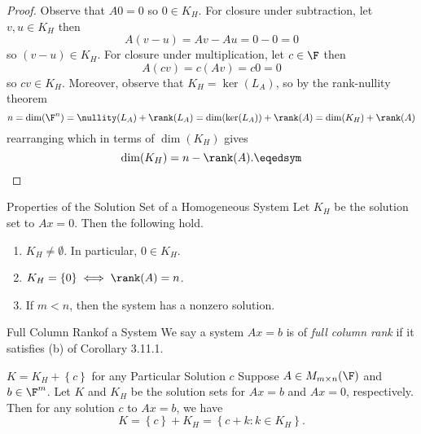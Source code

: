 \documentclass[linearalgebraI]{subfiles}
\begin{document}
    \begin{proof}
        Observe that $A0 = 0$ so $0\in K_H$. For closure under subtraction, let $v, u\in K_H$ then
        \begin{equation*}
            A(v-u) = Av-Au = 0-0 = 0
        \end{equation*}
        so $(v-u)\in K_H$. For closure under multiplication, let $c\in \F$ then
        \begin{equation*}
            A(cv) = c(Av) = c0 = 0
        \end{equation*}
        so $cv\in K_H$. Moreover, observe that $K_H = \ker(L_A)$, so by the rank-nullity theorem
        \begin{equation*}
            n = \dim(\F^n) = \nullity (L_A) + \rank (L_A) = \dim (\ker(L_A)) + \rank(A) = \dim(K_H) + \rank(A)
        \end{equation*}
        rearranging which in terms of $\dim(K_H)$ gives
        \begin{equation*}
            \dim(K_H) = n - \rank(A). \eqedsym
        \end{equation*}
    \end{proof}

    \clearpage
    \begin{cor}{Properties of the Solution Set of a Homogeneous System}
        Let $K_H$ be the solution set to $Ax=0$. Then the following hold.
        \begin{enumerate}
            \item $K_H\neq \emptyset$. In particular, $0\in K_H$.
            \item $K_H = \left\lbrace 0 \right\rbrace \iff \rank(A) = n$.
            \item If $m<n$, then the system has a nonzero solution.
        \end{enumerate}
    \end{cor}	

    \begin{definition}{Full Column Rank}{of a System}
            We say a system $Ax=b$ is of \emph{full column rank} if it satisfies (b) of Corollary 3.11.1. 
    \end{definition}

    \begin{prop}{$K=K_H + \left\lbrace c \right\rbrace$ for any Particular Solution $c$}
        Suppose $A\in M_{m\times n}(\F)$ and $b\in \F^m$. Let $K$ and $K_H$ be the solution sets for $Ax=b$ and $Ax=0$, respectively. Then for any solution $c$ to $Ax=b$, we have
        \begin{equation*}
            K = \left\lbrace c \right\rbrace + K_H = \left\lbrace c+k: k\in K_H \right\rbrace.
        \end{equation*}
    \end{prop}
\end{document}
